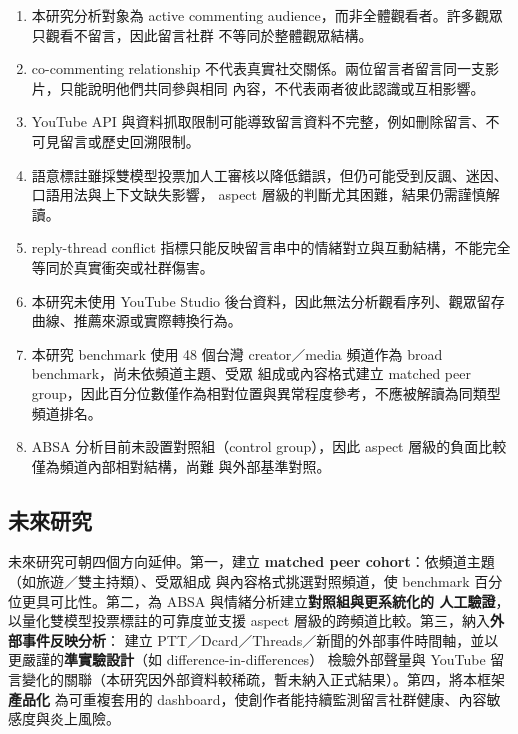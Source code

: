 \begin{enumerate}
  \item 本研究分析對象為 active commenting audience，而非全體觀看者。許多觀眾只觀看不留言，因此留言社群
        不等同於整體觀眾結構。
  \item co-commenting relationship 不代表真實社交關係。兩位留言者留言同一支影片，只能說明他們共同參與相同
        內容，不代表兩者彼此認識或互相影響。
  \item YouTube API 與資料抓取限制可能導致留言資料不完整，例如刪除留言、不可見留言或歷史回溯限制。
  \item 語意標註雖採雙模型投票加人工審核以降低錯誤，但仍可能受到反諷、迷因、口語用法與上下文缺失影響，
        aspect 層級的判斷尤其困難，結果仍需謹慎解讀。
  \item reply-thread conflict 指標只能反映留言串中的情緒對立與互動結構，不能完全等同於真實衝突或社群傷害。
  \item 本研究未使用 YouTube Studio 後台資料，因此無法分析觀看序列、觀眾留存曲線、推薦來源或實際轉換行為。
  \item 本研究 benchmark 使用 48 個台灣 creator／media 頻道作為 broad benchmark，尚未依頻道主題、受眾
        組成或內容格式建立 matched peer group，因此百分位數僅作為相對位置與異常程度參考，不應被解讀為同類型
        頻道排名。
  \item ABSA 分析目前未設置對照組（control group），因此 aspect 層級的負面比較僅為頻道內部相對結構，尚難
        與外部基準對照。
\end{enumerate}

\subsection{未來研究}

未來研究可朝四個方向延伸。第一，建立 \textbf{matched peer cohort}：依頻道主題（如旅遊／雙主持類）、受眾組成
與內容格式挑選對照頻道，使 benchmark 百分位更具可比性。第二，為 ABSA 與情緒分析建立\textbf{對照組與更系統化的
人工驗證}，以量化雙模型投票標註的可靠度並支援 aspect 層級的跨頻道比較。第三，納入\textbf{外部事件反映分析}：
建立 PTT／Dcard／Threads／新聞的外部事件時間軸，並以更嚴謹的\textbf{準實驗設計}（如 difference-in-differences）
檢驗外部聲量與 YouTube 留言變化的關聯（本研究因外部資料較稀疏，暫未納入正式結果）。第四，將本框架\textbf{產品化}
為可重複套用的 dashboard，使創作者能持續監測留言社群健康、內容敏感度與炎上風險。
